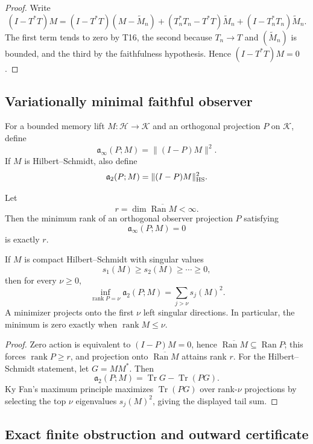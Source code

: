 \begin{proof}
Write
\[
(I-T^*T)M
=(I-T^*T)(M-\widetilde M_n)
 +(T_n^*T_n-T^*T)\widetilde M_n
 +(I-T_n^*T_n)\widetilde M_n.
\]
The first term tends to zero by T16, the second because $T_n\to T$ and $(\widetilde M_n)$ is bounded, and the third by the faithfulness hypothesis. Hence $(I-T^*T)M=0$.
\end{proof}

\subsection{Variationally minimal faithful observer}

For a bounded memory lift $M:\mathcal H\to\mathcal K$ and an orthogonal projection $P$ on $\mathcal K$, define
\[
\mathfrak a_\infty(P;M)=\|(I-P)M\|^2.
\]
If $M$ is Hilbert--Schmidt, also define
\[
\mathfrak a_2(P;M)=\|(I-P)M\|_{\rm HS}^2.
\]

\begin{theorem}
Let
\[
r=\dim\overline{\operatorname{Ran}M}<\infty.
\]
Then the minimum rank of an orthogonal observer projection $P$ satisfying
\[
\mathfrak a_\infty(P;M)=0
\]
is exactly $r$.

If $M$ is compact Hilbert--Schmidt with singular values
\[
s_1(M)\ge s_2(M)\ge\cdots\ge0,
\]
then for every $\nu\ge0$,
\[
\inf_{\operatorname{rank}P=\nu}
\mathfrak a_2(P;M)
=\sum_{j>\nu}s_j(M)^2.
\]
A minimizer projects onto the first $\nu$ left singular directions. In particular, the minimum is zero exactly when $\operatorname{rank}M\le\nu$.
\end{theorem}

\begin{proof}
Zero action is equivalent to $(I-P)M=0$, hence $\overline{\operatorname{Ran}M}\subseteq\operatorname{Ran}P$; this forces $\operatorname{rank}P\ge r$, and projection onto $\overline{\operatorname{Ran}M}$ attains rank $r$. For the Hilbert--Schmidt statement, let $G=MM^*$. Then
\[
\mathfrak a_2(P;M)
=\operatorname{Tr}G-\operatorname{Tr}(PG).
\]
Ky Fan's maximum principle maximizes $\operatorname{Tr}(PG)$ over rank-$\nu$ projections by selecting the top $\nu$ eigenvalues $s_j(M)^2$, giving the displayed tail sum.
\end{proof}

\subsection{Exact finite obstruction and outward certificate}

